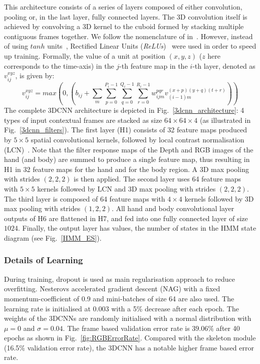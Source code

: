 This  architecture consists of a series of layers composed of either convolution, pooling or, in the last layer, fully connected layers.
The 3D convolution itself is achieved by convolving a 3D kernel to the cuboid formed by stacking multiple contiguous frames together. We follow the nomenclature of in~\cite{ji20133d}.
 However, instead of using $tanh$ units~\cite{ji20133d},  Rectified Linear Units (\emph{ReLUs})~\cite{krizhevsky2012imagenet} were used in order to speed up training.
 Formally, the value of a unit at position $(x, y, z)$ ($z$ here corresponds to the time-axis) in the $j$-th feature map in the $i$-th layer, denoted as $v^{xyz}_{ij}$, is given by:
\begin{equation}
v^{xyz}_{ij} =  max( 0,  ( b_{ij} + \sum_m \sum_{p=0}^{P_i - 1} \sum_{q=0}^{Q_i -1 } \sum_{r=0}^{R_i -1} w^{pqr}_{ijm} v^{(x+p)(y+q)(t+r)}_{(i-1)m} ))
\label{ReLU}
\end{equation}
%
The complete 3DCNN architecture is depicted in Fig.~\ref{3dcnn_architecture}:
4 types of input contextual frames are stacked as size $64\times64\times4$ (as illustrated in Fig.~\ref{3dcnn_filters}).
%
The first layer (H1) consists of 32 feature maps produced by $5\times5$ spatial convolutional kernels,
followed by local contrast normalisation (LCN)~\cite{jarrett2009best}.
%
Note that the filter response maps of the Depth and RGB images of the hand (and body) are summed to produce a single feature map,
thus resulting in H1 in 32 feature maps for the hand and for the body region.
%
A 3D max pooling with strides $(2,2,2)$ is then applied.
%
The second layer uses 64 feature maps with $5\times5$ kernels followed by LCN and 3D max pooling with strides $(2,2,2)$.
The third layer is composed of 64 feature maps with $4\times4$ kernels followed by 3D max pooling with strides $(1,2,2)$.
All hand and body convolutional layer outputs of H6 are flattened in H7, and fed into one fully connected layer of size $1024$.
%
Finally, the output layer has \numberhiddenstate values, the number of states in the HMM state diagram (see Fig.~\ref{HMM_ES}).




\subsubsection{Details of Learning}
During training, dropout \cite{hinton2012improving} is used as main regularisation approach to reduce overfitting.
Nesterovs accelerated gradient descent (NAG) \cite{sutskever2013importance} with a fixed momentum-coefficient of 0.9 and mini-batches of size 64 are also used.
The learning rate is initialised at 0.003 with a 5\% decrease after each epoch. The weights of the 3DCNNs are randomly initialised with a normal distribution with $\mu = 0$ and $\sigma = 0.04$.
The frame based validation error rate is $39.06\%$ after 40 epochs as shown in Fig.~\ref{fig:RGBErrorRate}.
Compared with the skeleton module (16.5\% validation error rate), the 3DCNN has a notable higher frame based error rate.


